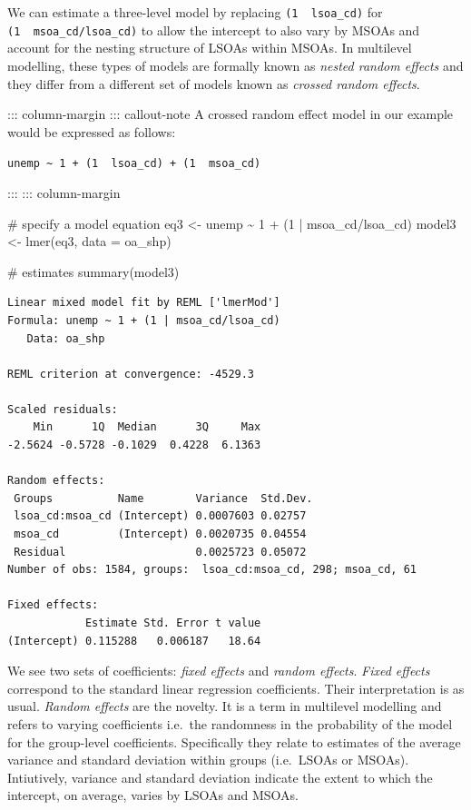 \documentclass[
  letterpaper,
  DIV=11,
  numbers=noendperiod,
  oneside]{scrreprt}
\newenvironment{Shaded}{\begin{snugshade}}{\end{snugshade}}
\newcommand{\AttributeTok}[1]{\textcolor[rgb]{0.40,0.45,0.13}{#1}}
\newcommand{\CommentTok}[1]{\textcolor[rgb]{0.37,0.37,0.37}{#1}}
\newcommand{\DecValTok}[1]{\textcolor[rgb]{0.68,0.00,0.00}{#1}}
\newcommand{\FunctionTok}[1]{\textcolor[rgb]{0.28,0.35,0.67}{#1}}
\newcommand{\NormalTok}[1]{\textcolor[rgb]{0.00,0.23,0.31}{#1}}
\newcommand{\OtherTok}[1]{\textcolor[rgb]{0.00,0.23,0.31}{#1}}
\newcommand{\SpecialCharTok}[1]{\textcolor[rgb]{0.37,0.37,0.37}{#1}}
\begin{document}
We can estimate a three-level model by replacing
\texttt{(1\ \textbar{}\ lsoa\_cd)} for
\texttt{(1\ \textbar{}\ msoa\_cd/lsoa\_cd)} to allow the intercept to
also vary by MSOAs and account for the nesting structure of LSOAs within
MSOAs. In multilevel modelling, these types of models are formally known
as \emph{nested random effects} and they differ from a different set of
models known as \emph{crossed random effects}.

::: column-margin ::: callout-note A crossed random effect model in our
example would be expressed as follows:

\texttt{unemp\ \textasciitilde{}\ 1\ +\ (1\ \textbar{}\ lsoa\_cd)\ +\ (1\ \textbar{}\ msoa\_cd)}

::: ::: column-margin

\begin{Shaded}
\begin{Highlighting}[]
\CommentTok{\# specify a model equation}
\NormalTok{eq3 }\OtherTok{\textless{}{-}}\NormalTok{ unemp }\SpecialCharTok{\textasciitilde{}} \DecValTok{1} \SpecialCharTok{+}\NormalTok{ (}\DecValTok{1} \SpecialCharTok{|}\NormalTok{ msoa\_cd}\SpecialCharTok{/}\NormalTok{lsoa\_cd)}
\NormalTok{model3 }\OtherTok{\textless{}{-}} \FunctionTok{lmer}\NormalTok{(eq3, }\AttributeTok{data =}\NormalTok{ oa\_shp)}

\CommentTok{\# estimates}
\FunctionTok{summary}\NormalTok{(model3)}
\end{Highlighting}
\end{Shaded}

\begin{verbatim}
Linear mixed model fit by REML ['lmerMod']
Formula: unemp ~ 1 + (1 | msoa_cd/lsoa_cd)
   Data: oa_shp

REML criterion at convergence: -4529.3

Scaled residuals: 
    Min      1Q  Median      3Q     Max 
-2.5624 -0.5728 -0.1029  0.4228  6.1363 

Random effects:
 Groups          Name        Variance  Std.Dev.
 lsoa_cd:msoa_cd (Intercept) 0.0007603 0.02757 
 msoa_cd         (Intercept) 0.0020735 0.04554 
 Residual                    0.0025723 0.05072 
Number of obs: 1584, groups:  lsoa_cd:msoa_cd, 298; msoa_cd, 61

Fixed effects:
            Estimate Std. Error t value
(Intercept) 0.115288   0.006187   18.64
\end{verbatim}

We see two sets of coefficients: \emph{fixed effects} and \emph{random
effects}. \emph{Fixed effects} correspond to the standard linear
regression coefficients. Their interpretation is as usual. \emph{Random
effects} are the novelty. It is a term in multilevel modelling and
refers to varying coefficients i.e.~the randomness in the probability of
the model for the group-level coefficients. Specifically they relate to
estimates of the average variance and standard deviation within groups
(i.e.~LSOAs or MSOAs). Intiutively, variance and standard deviation
indicate the extent to which the intercept, on average, varies by LSOAs
and MSOAs.
\end{document}
